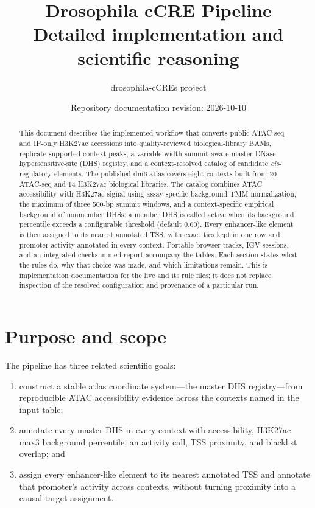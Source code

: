 \documentclass[11pt]{article}
\title{\textbf{Drosophila cCRE Pipeline}\\[0.3em]
\large Detailed implementation and scientific reasoning}
\author{drosophila-cCREs project}
\date{Repository documentation revision: 2026-10-10}
\newcommand{\filep}[1]{\path{#1}}
\begin{document}
\maketitle

\begin{abstract}
This document describes the implemented workflow that converts public ATAC-seq
and IP-only H3K27ac accessions into quality-reviewed biological-library BAMs,
replicate-supported context peaks, a variable-width summit-aware master
DNase-hypersensitive-site (DHS) registry, and a context-resolved catalog of
candidate \emph{cis}-regulatory elements.  The published dm6 atlas covers eight
contexts built from 20 ATAC-seq and 14 H3K27ac biological libraries.  The
catalog combines ATAC accessibility with H3K27ac signal using assay-specific
background TMM normalization, the maximum of three 500-bp summit windows, and a
context-specific empirical background of nonmember DHSs; a member DHS is called
active when its background percentile exceeds a configurable threshold
(default 0.60).  Every enhancer-like element is then assigned to its nearest
annotated TSS, with exact ties kept in one row and promoter activity annotated
in every context.  Portable browser tracks, IGV sessions, and an integrated
checksummed report accompany the tables.  Each section states what the rules
do, why that choice was made, and which limitations remain.  This is
implementation documentation for the live \filep{workflow/Snakefile} and its
rule files; it does not replace inspection of the resolved configuration and
provenance of a particular run.
\end{abstract}

\tableofcontents
\newpage

\section{Purpose and scope}

The pipeline has three related scientific goals:

\begin{enumerate}
  \item construct a stable atlas coordinate system---the master DHS
  registry---from reproducible ATAC accessibility evidence across the contexts
  named in the input table;
  \item annotate every master DHS in every context with accessibility,
  H3K27ac max3 background percentile, an activity call, TSS proximity, and
  blacklist overlap; and
  \item assign every enhancer-like element to its nearest annotated TSS and
  annotate that promoter's activity across contexts, without turning proximity
  into a causal target assignment.
\end{enumerate}
\end{document}
